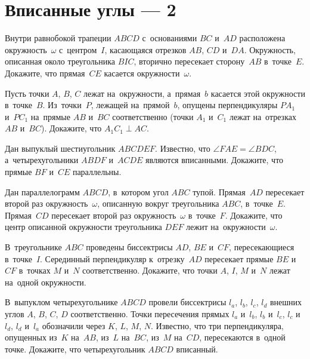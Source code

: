 
\section*{Вписанные углы --- 2}


\begin{problems}

\item
Внутри равнобокой трапеции $ABCD$ с~основаниями $BC$ и~$AD$ расположена
окружность~$\omega$ с~центром~$I$, касающаяся отрезков $AB$, $CD$ и~$DA$.
Окружность, описанная около треугольника $BIC$, вторично пересекает
сторону~$AB$ в~точке~$E$.
Докажите, что прямая~$CE$ касается окружности~$\omega$.

\item
Пусть точки $A$, $B$, $C$ лежат на~окружности, а~прямая~$b$ касается этой
окружности в~точке~$B$.
Из~точки~$P$, лежащей на~прямой~$b$, опущены перпендикуляры $P A_1$ и~$P C_1$
на~прямые $AB$ и~$BC$ соответственно
(точки $A_1$ и~$C_1$ лежат на~отрезках $AB$ и~$BC$).
Докажите, что $A_1 C_1 \perp AC$.

\item
Дан выпуклый шестиугольник $ABCDEF$.
Известно, что $\angle FAE = \angle BDC$, а~четырехугольники $ABDF$ и~$ACDE$
являются вписанными.
Докажите, что прямые $BF$ и~$CE$ параллельны.

\item
Дан параллелограмм $ABCD$, в~котором угол $ABC$ тупой.
Прямая~$AD$ пересекает второй раз окружность~$\omega$, описанную вокруг
треугольника $ABC$, в~точке~$E$.
Прямая~$CD$ пересекает второй раз окружность~$\omega$ в~точке~$F$.
Докажите, что центр описанной окружности треугольника $DEF$ лежит
на~окружности~$\omega$.

\item
В~треугольнике $ABC$ проведены биссектрисы $AD$, $BE$ и~$CF$, пересекающиеся
в~точке~$I$.
Серединный перпендикуляр к~отрезку~$AD$ пересекает прямые $BE$ и~$CF$
в~точках $M$ и~$N$ соответственно.
Докажите, что точки $A$, $I$, $M$ и~$N$ лежат на~одной окружности.

\item
В~выпуклом четырехугольнике $ABCD$ провели биссектрисы
$l_{a}$, $l_{b}$, $l_{c}$, $l_{d}$ внешних углов $A$, $B$, $C$, $D$
соответственно.
Точки пересечения прямых $l_{a}$ и~$l_{b}$, $l_{b}$ и~$l_{c}$,
$l_{c}$ и~$l_{d}$, $l_{d}$ и~$l_{a}$ обозначили через $K$, $L$, $M$, $N$.
Известно, что три перпендикуляра, опущенных из~$K$ на~$AB$, из~$L$ на~$BC$,
из~$M$ на~$CD$, пересекаются в~одной точке.
Докажите, что четырехугольник $ABCD$ вписанный.


\end{problems}
